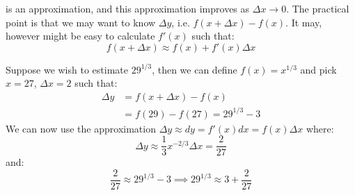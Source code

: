 \begin{itemize}
\begin{idea}
    is an approximation, and this approximation improves as $\Delta x \to 0$. The practical point is that we may want to know $\Delta y$, i.e. $f(x+\Delta x)-f(x)$. It may, however might be easy to calculate $f'(x)$ such that:
    \begin{equation}
        f(x+\Delta x) \approx f(x)+f'(x)\Delta x
        \label{eq:}
    \end{equation}
\end{idea}
\begin{example}
    Suppose we wish to estimate $29^{1/3}$, then we can define $f(x)=x^{1/3}$ and pick $x=27$, $\Delta x=2$ such that:
    \begin{align}
        \Delta y &= f(x+\Delta x)-f(x) \\ 
        &= f(29)-f(27)=29^{1/3}-3 
        \label{eq:}
    \end{align}
    We can now use the approximation $\Delta y \approx dy = f'(x)dx = f(x)\Delta x$ where:
    \begin{equation}
        \Delta y \approx \frac{1}{3}x^{-2/3}\Delta x = \frac{2}{27}
        \label{eq:}
    \end{equation}
    and:
    \begin{equation}
        \frac{2}{27} \approx 29^{1/3}-3 \implies 29^{1/3} \approx 3+\frac{2}{27}
        \label{eq:}
    \end{equation}    
\end{example}
\end{itemize}
